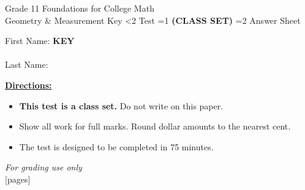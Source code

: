 \documentclass[addpoints]{exam}
\newcommand{\event}{Geometry \& Measurement}
\newcommand{\tournament}{}
\def\type{0}
\begin{document}
\begin{center}
    {\huge Grade 11 Foundations for College Math \\ \event
    \ifprintanswers \space Key
    \else \space \ifnum\type<2 Test \fi \ifnum\type=1 \textbf{(CLASS SET)} \fi
          \ifnum\type=2 Answer Sheet \fi
    \fi \\ \vspace{3mm}\tournament\vspace{1mm}}
\end{center}

\vspace{.25\textheight}

\begin{center}
    First Name: \ifprintanswers
    \underline{\hspace{3.5cm}}\textbf{KEY}\underline{\hspace{5.5cm}}\\\ \vspace{5mm}
    \else \underline{\hspace{10cm}}\\ \vspace{5mm} \fi
    Last Name: \underline{\hspace{10cm}}\\ \vspace{5mm}
\end{center}

\noindent\textbf{\underline{Directions:}}
\begin{itemize}
    \ifnum\type=1 \item \textbf{This test is a class set.} Do not write on this paper. \fi
    \item Show all work for full marks. Round dollar amounts to the nearest cent.
    \item The test is designed to be completed in 75 minutes.
\end{itemize}
\begin{center}
\textit{For grading use only}\\
[pages]
\end{center}
\end{document}
